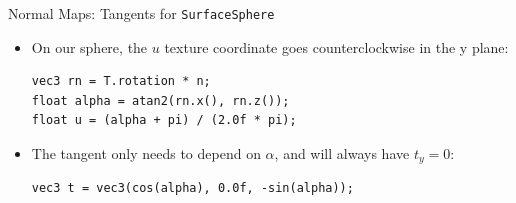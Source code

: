 \documentclass[utf8,stillsansserifmath,fleqn,t]{beamer}
\newcommand{\code}[1]{\texttt{#1}}
\begin{document}
\begin{frame}[fragile]
\frametitle{\insertsection}
Normal Maps: Tangents for \code{SurfaceSphere}
\begin{itemize}
\item On our sphere, the $u$ texture coordinate goes counterclockwise in the y plane:
\begin{lstlisting}
vec3 rn = T.rotation * n;
float alpha = atan2(rn.x(), rn.z());
float u = (alpha + pi) / (2.0f * pi);
\end{lstlisting}
\item The tangent only needs to depend on $\alpha$, and will always have $t_y=0$:
\begin{lstlisting}
vec3 t = vec3(cos(alpha), 0.0f, -sin(alpha));
\end{lstlisting}
\end{itemize}
\end{frame}
\end{document}
